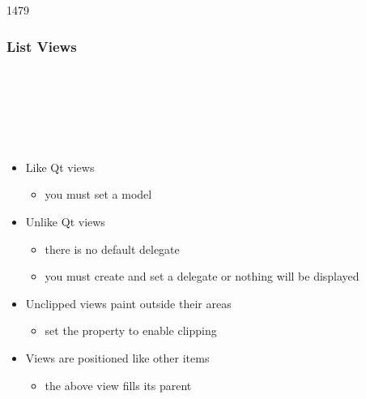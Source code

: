 \begin{slide}{1479}\frametitle{List Views}

\begin{qml}
\\
\\
\\
\\
\\
\qtt{\}}
\end{qml}

\begin{itemize}
\item Like Qt views
  \begin{itemize}
  \item you must set a model
  \end{itemize}
\item Unlike Qt views
  \begin{itemize}
  \item there is no default delegate
  \item you must create and set a delegate or nothing will be displayed
  \end{itemize}
\item Unclipped views paint outside their areas
  \begin{itemize}
  \item set the  property to enable clipping
  \end{itemize}
\item Views are positioned like other items
  \begin{itemize}
  \item the above view fills its parent
  \end{itemize}
\end{itemize}



\end{slide}



